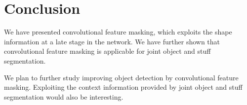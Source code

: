 \documentclass[10pt,twocolumn,letterpaper]{article}
\begin{document}
\section{Conclusion}

We have presented convolutional feature masking, which exploits the shape information at a late stage in the network. We have further shown that convolutional feature masking is applicable for joint object and stuff segmentation.

We plan to further study improving object detection by convolutional feature masking.
Exploiting the context information provided by joint object and stuff segmentation would also be interesting.

{\small


}
\end{document}
